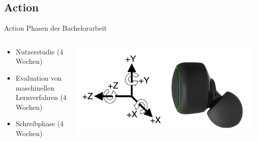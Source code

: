 \documentclass[18pt]{beamer}
\begin{document}
\subsection{Action}
\begin{frame}{Action}
Phasen der Bachelorarbeit
    \begin{columns}[T] %
	\begin{column}{.48\textwidth}
	    \begin{itemize}
	    	\item Nutzerstudie (4 Wochen)
	    	\item Evaluation von maschinellen Lernverfahren (4 Wochen)
	    	\item Schreibphase (4 Wochen)
	    \end{itemize}
	\end{column}%
	\hfill%
	\begin{column}{.48\textwidth}
	    \includegraphics[scale=0.25]{logos/esense2}
	\end{column}%
    \end{columns}
\end{frame}

\end{document}
